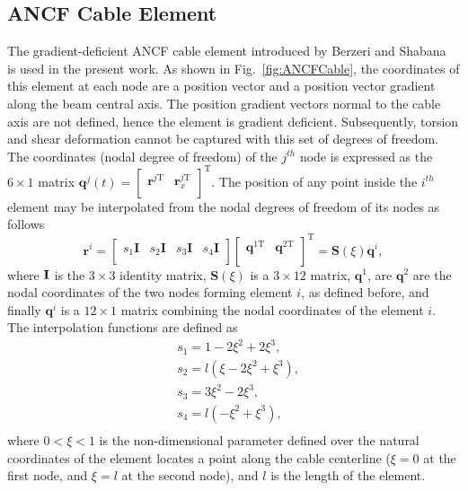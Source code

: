 \subsection{ANCF Cable Element}\label{sec:1DElem}
The gradient-deficient ANCF cable element introduced by Berzeri and Shabana~\cite{berzeri2000} is used in the present work. As shown in Fig.~\ref{fig:ANCFCable}, the coordinates of this element at each node are a position vector and a position vector gradient along the beam central axis. The position gradient vectors normal to the cable axis are not defined, hence the element is gradient deficient. Subsequently, torsion and shear deformation cannot be captured with this set of degrees of freedom. The coordinates (nodal degree of freedom) of the $j^{th}$ node is expressed as the $6 \times 1$ matrix \small${{\bm{q}}^{j}}(t)={{\left[ \begin{matrix}
		\bm{r}_{{}}^{j\text{T}} & \bm{r}_{x}^{j\text{T}}  \\
		\end{matrix} \right]}^{\text{T}}}$. \normalsize The position of any point inside the $i^{th}$ element may be interpolated from the nodal degrees of freedom of its nodes as follows
\begin{equation} \label{eq:ANCF_Beam_r}
\bm{r}^{i}=\left[ \begin{matrix}
{{s}_{1}}\bm{I} & {{s}_{2}}\bm{I} & {{s}_{3}}\bm{I} & {{s}_{4}}\bm{I}  \\
\end{matrix} \right]\left[ \begin{matrix}
\bm{q}_{}^{1\text{T}} & \bm{q}_{}^{2\text{T}}  \\
\end{matrix} \right]^\text{T}=\bm{S}\left( \xi  \right)\bm{q}^{i},
\end{equation}
where $\mathbf{I}$ is the $3\times3$ identity matrix, $\bm{S}\left( \xi  \right)$ is a $3 \times 12$ matrix, $\bm{q}^1$, are $\bm{q}^2$ are the nodal coordinates of the two nodes forming element $i$, as defined before, and finally $\bm{q}^{i}$ is a $12\times1$ matrix combining the nodal coordinates of the element $i$. The interpolation functions are defined as
\begin{equation} \label{eq:ANCF_Beam_Shapefunctions}
\begin{split}
& {{s}_{1}}=1-2{{\xi}^{2}}+2{{\xi}^{3}}, \\
& {{s}_{2}}=l\left( \xi-2{{\xi}^{2}}+{{\xi}^{3}} \right), \\
& {{s}_{3}}=3{{\xi}^{2}}-2{{\xi}^{3}}, \\
& {{s}_{4}}=l\left( -{{\xi}^{2}}+{{\xi}^{3}} \right), \\
\end{split}
\end{equation}
where $0<\xi <1$ is the non-dimensional parameter defined over the natural coordinates of the element locates a point along the cable centerline ($\xi=0$ at the first node, and $\xi=l$ at the second node), and $l$ is the length of the element.

